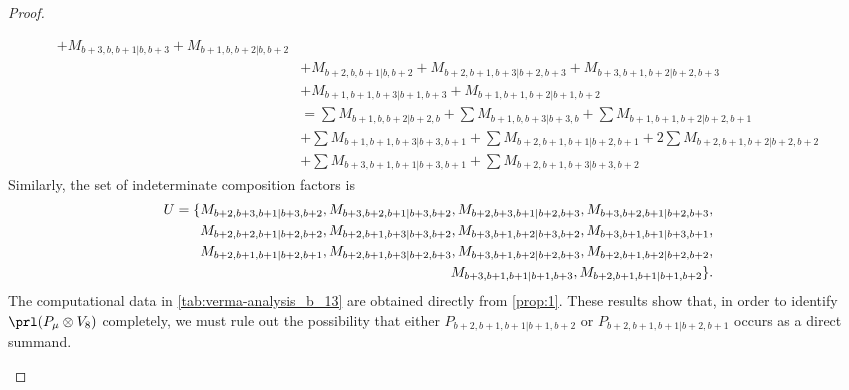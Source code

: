 \begin{proof}
\begin{enumerate}
\begin{enumerate}
\begin{equation}
\begin{aligned}
+ M_{b+3,b,b+1|b,b+3}
+ M_{b+1,b,b+2|b,b+2}\\
                                              &
+ M_{b+2,b,b+1|b,b+2}
+ M_{b+2,b+1,b+3|b+2,b+3}
+ M_{b+3,b+1,b+2|b+2,b+3}\\
                                              &
+ M_{b+1,b+1,b+3|b+1,b+3}
+ M_{b+1,b+1,b+2|b+1,b+2} \\
                                               &=
\sum M_{b+1,b,b+2|b+2,b}
+ \sum M_{b+1,b,b+3|b+3,b}
+ \sum M_{b+1,b+1,b+2|b+2,b+1}\\
                                              &
+ \sum M_{b+1,b+1,b+3|b+3,b+1}
+ \sum M_{b+2,b+1,b+1|b+2,b+1}
+ 2\sum M_{b+2,b+1,b+2|b+2,b+2}\\
                                              &
+ \sum M_{b+3,b+1,b+1|b+3,b+1}
+ \sum M_{b+2,b+1,b+3|b+3,b+2}
          \end{aligned}
        \end{equation}
      Similarly, the set of indeterminate composition factors is 
\begin{equation}\notag
  \begin{aligned}
    U = \{
M_{b+2,b+3,b+1|b+3,b+2},
M_{b+3,b+2,b+1|b+3,b+2},
M_{b+2,b+3,b+1|b+2,b+3},
M_{b+3,b+2,b+1|b+2,b+3},\\
M_{b+2,b+2,b+1|b+2,b+2},
M_{b+2,b+1,b+3|b+3,b+2},
M_{b+3,b+1,b+2|b+3,b+2},
M_{b+3,b+1,b+1|b+3,b+1},\\
M_{b+2,b+1,b+1|b+2,b+1},
M_{b+2,b+1,b+3|b+2,b+3},
M_{b+3,b+1,b+2|b+2,b+3},
M_{b+2,b+1,b+2|b+2,b+2},\\
M_{b+3,b+1,b+1|b+1,b+3},
M_{b+2,b+1,b+1|b+1,b+2}
\}. 
  \end{aligned}
\end{equation}
      The computational data in \cref{tab:verma-analysis_b_13} are obtained directly from \cref{prop:1}. These results show that, in order to identify $\prl(P_\mu \otimes V_8)$ completely, we must rule out the possibility that either $P_{b+2,b+1,b+1|b+1,b+2}$ or $P_{b+2,b+1,b+1|b+2,b+1}$ occurs as a direct summand.


\end{enumerate}
\end{enumerate}
\end{proof}
